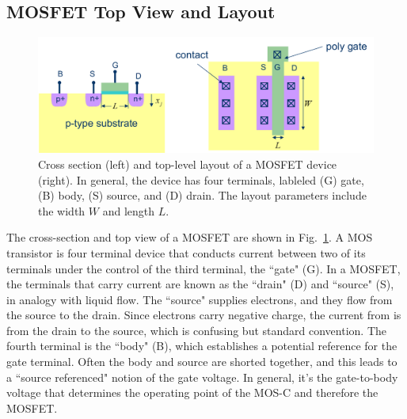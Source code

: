 \subsection{MOSFET Top View and Layout}
\begin{figure}[tb]
\centering
\includegraphics[width=.95\columnwidth]{mosfet_layout}
\caption{Cross section (left) and top-level layout of a MOSFET device (right).  In general, the device has four terminals, lableled (G) gate, (B) body, (S) source, and (D) drain.  The layout parameters include the width $W$ and length $L$.}
\label{fig:mosfet_layout}
\end{figure}
The cross-section and top view of a MOSFET are shown in Fig.~\ref{fig:mosfet_layout}.  A MOS transistor is four terminal device that conducts current between two of its terminals under the control of the third terminal, the ``gate" (G).  In a MOSFET, the terminals that carry current are known as the ``drain" (D) and ``source" (S), in analogy with liquid flow.  The ``source" supplies electrons, and they flow from the source to the drain.  Since electrons carry negative charge, the current from is from the drain to the source, which is confusing but standard convention.  The fourth terminal is the ``body" (B), which establishes a potential reference for the gate terminal.  Often the body and source are shorted together, and this leads to a ``source referenced" notion of the gate voltage.  In general, it's the gate-to-body voltage that determines the operating point of the MOS-C and therefore the MOSFET.
